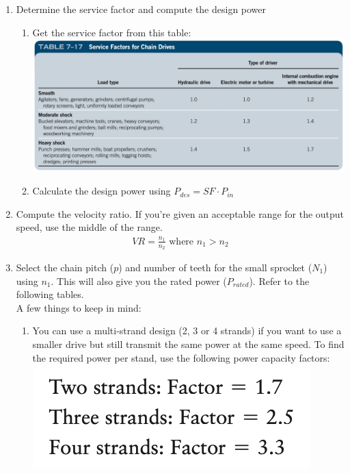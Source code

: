 \documentclass[11pt, fleqn]{article}
\begin{document}
\begin{enumerate}
    \item Determine the service factor and compute the design power\\
    \begin{enumerate}
        \item Get the service factor from this table:\\
        \includegraphics[scale=0.45]{Belts/chain-service.png}
        \item Calculate the design power using $P_{des}=SF\cdot P_{in}$
    \end{enumerate}
    \item Compute the velocity ratio. If you're given an acceptable range for the output speed, use the middle of the range.
    \begin{align*}
        VR=\frac{n_1}{n_2}\text{ where $n_1 > n_2$}
    \end{align*}
    \item Select the chain pitch ($p$) and number of teeth for the small sprocket ($N_1$) using $n_1$. This will also give you the rated power ($P_{rated}$). Refer to the following tables.\\
    A few things to keep in mind:\\
    \begin{enumerate}
        \item You can use a multi-strand design (2, 3 or 4 strands) if you want to use a smaller drive but still transmit the same power at the same speed. To find the required power per stand, use the following power capacity factors:\\
        \includegraphics[scale=0.4]{Belts/power-capacity.png}\\

\end{enumerate}
\end{enumerate}
\end{document}
